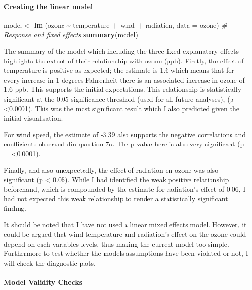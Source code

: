 \documentclass[
]{article}
\newenvironment{Shaded}{\begin{snugshade}}{\end{snugshade}}
\newcommand{\AttributeTok}[1]{\textcolor[rgb]{0.13,0.29,0.53}{#1}}
\newcommand{\CommentTok}[1]{\textcolor[rgb]{0.56,0.35,0.01}{\textit{#1}}}
\newcommand{\FunctionTok}[1]{\textcolor[rgb]{0.13,0.29,0.53}{\textbf{#1}}}
\newcommand{\NormalTok}[1]{#1}
\newcommand{\OtherTok}[1]{\textcolor[rgb]{0.56,0.35,0.01}{#1}}
\newcommand{\SpecialCharTok}[1]{\textcolor[rgb]{0.81,0.36,0.00}{\textbf{#1}}}
\begin{document}
\paragraph{Creating the linear model}\label{creating-the-linear-model}

\begin{Shaded}
\begin{Highlighting}[]
\NormalTok{model }\OtherTok{\textless{}{-}} \FunctionTok{lm}\NormalTok{ (ozone }\SpecialCharTok{\textasciitilde{}}\NormalTok{ temperature }\SpecialCharTok{+}\NormalTok{ wind }\SpecialCharTok{+}\NormalTok{ radiation, }\AttributeTok{data =}\NormalTok{ ozone)  }\CommentTok{\# Response and fixed effects}
\FunctionTok{summary}\NormalTok{(model)}
\end{Highlighting}
\end{Shaded}

The summary of the model which including the three fixed explanatory
effects highlights the extent of their relationship with ozone (ppb).
Firstly, the effect of temperature is positive as expected; the estimate
is 1.6 which means that for every increase in 1 degrees Fahrenheit there
is an associated increase in ozone of 1.6 ppb. This supports the initial
expectations. This relationship is statistically significant at the 0.05
significance threshold (used for all future analyses), (p
\textless0.0001). This was the most significant result which I also
predicted given the initial visualisation.

For wind speed, the estimate of -3.39 also supports the negative
correlations and coefficients observed din question 7a. The p-value here
is also very significant (p = \textless0.0001).

Finally, and also unexpectedly, the effect of radiation on ozone was
also significant (p \textless{} 0.05). While I had identified the weak
positive relationship beforehand, which is compounded by the estimate
for radiation's effect of 0.06, I had not expected this weak
relationship to render a statistically significant finding.

It should be noted that I have not used a linear mixed effects model.
However, it could be argued that wind temperature and radiation's effect
on the ozone could depend on each variables levels, thus making the
current model too simple. Furthermore to test whether the models
assumptions have been violated or not, I will check the diagnostic
plots.

\paragraph{Model Validity Checks}\label{model-validity-checks}
\end{document}
